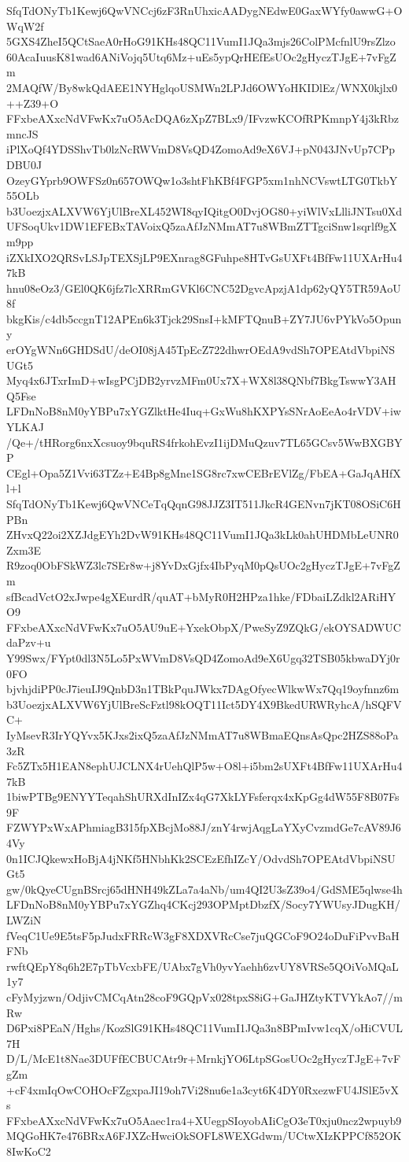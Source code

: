 SfqTdONyTb1Kewj6QwVNCcj6zF3RnUhxicAADygNEdwE0GaxWYfy0awwG+OWqW2f
5GXS4ZheI5QCtSaeA0rHoG91KHs48QC11VumI1JQa3mjs26ColPMcfnlU9rsZlzo
60AcaIuusK81wad6ANiVojq5Utq6Mz+uEs5ypQrHEfEsUOc2gHyczTJgE+7vFgZm
2MAQfW/By8wkQdAEE1NYHglqoUSMWn2LPJd6OWYoHKIDlEz/WNX0kjlx0++Z39+O
FFxbeAXxcNdVFwKx7uO5AcDQA6zXpZ7BLx9/IFvzwKCOfRPKmnpY4j3kRbzmncJS
iPlXoQf4YDSShvTb0lzNcRWVmD8VsQD4ZomoAd9eX6VJ+pN043JNvUp7CPpDBU0J
OzeyGYprb9OWFSz0n657OWQw1o3shtFhKBf4FGP5xm1nhNCVswtLTG0TkbY55OLb
b3UoezjxALXVW6YjUlBreXL452WI8qyIQitgO0DvjOG80+yiWlVxLlliJNTsu0Xd
UFSoqUkv1DW1EFEBxTAVoixQ5zaAfJzNMmAT7u8WBmZTTgciSnw1sqrlf9gXm9pp
iZXkIXO2QRSvLSJpTEXSjLP9EXnrag8GFuhpe8HTvGsUXFt4BfFw11UXArHu47kB
hnu08eOz3/GEl0QK6jfz7lcXRRmGVKl6CNC52DgvcApzjA1dp62yQY5TR59AoU8f
bkgKis/c4db5ccgnT12APEn6k3Tjck29SnsI+kMFTQnuB+ZY7JU6vPYkVo5Opuny
erOYgWNn6GHDSdU/deOI08jA45TpEcZ722dhwrOEdA9vdSh7OPEAtdVbpiNSUGt5
Myq4x6JTxrImD+wIsgPCjDB2yrvzMFm0Ux7X+WX8l38QNbf7BkgTswwY3AHQ5Fse
LFDnNoB8nM0yYBPu7xYGZlktHe4Iuq+GxWu8hKXPYsSNrAoEeAo4rVDV+iwYLKAJ
/Qe+/tHRorg6nxXcsuoy9bquRS4frkohEvzI1ijDMuQzuv7TL65GCsv5WwBXGBYP
CEgl+Opa5Z1Vvi63TZz+E4Bp8gMne1SG8rc7xwCEBrEVlZg/FbEA+GaJqAHfXl+l
SfqTdONyTb1Kewj6QwVNCeTqQqnG98JJZ3IT511JkcR4GENvn7jKT08OSiC6HPBn
ZHvxQ22oi2XZJdgEYh2DvW91KHs48QC11VumI1JQa3kLk0ahUHDMbLeUNR0Zxm3E
R9zoq0ObFSkWZ3lc7SEr8w+j8YvDxGjfx4IbPyqM0pQsUOc2gHyczTJgE+7vFgZm
sfBcadVctO2xJwpe4gXEurdR/quAT+bMyR0H2HPza1hke/FDbaiLZdkl2ARiHYO9
FFxbeAXxcNdVFwKx7uO5AU9uE+YxekObpX/PweSyZ9ZQkG/ekOYSADWUCdaPzv+u
Y99Swx/FYpt0dl3N5Lo5PxWVmD8VsQD4ZomoAd9eX6Ugq32TSB05kbwaDYj0r0FO
bjvhjdiPP0cJ7ieuIJ9QnbD3n1TBkPquJWkx7DAgOfyecWlkwWx7Qq19oyfnnz6m
b3UoezjxALXVW6YjUlBreScFztl98kOQT11Ict5DY4X9BkedURWRyhcA/hSQFVC+
IyMsevR3IrYQYvx5KJxs2ixQ5zaAfJzNMmAT7u8WBmaEQnsAsQpc2HZS88oPa3zR
Fc5ZTx5H1EAN8ephUJCLNX4rUehQlP5w+O8l+i5bm2sUXFt4BfFw11UXArHu47kB
1biwPTBg9ENYYTeqahShURXdInIZx4qG7XkLYFsferqx4xKpGg4dW55F8B07Fs9F
FZWYPxWxAPhmiagB315fpXBcjMo88J/znY4rwjAqgLaYXyCvzmdGe7cAV89J64Vy
0n1ICJQkewxHoBjA4jNKf5HNbhKk2SCEzEfhIZcY/OdvdSh7OPEAtdVbpiNSUGt5
gw/0kQyeCUgnBSrcj65dHNH49kZLa7a4aNb/um4QI2U3sZ39o4/GdSME5qlwse4h
LFDnNoB8nM0yYBPu7xYGZhq4CKcj293OPMptDbzfX/Socy7YWUsyJDugKH/LWZiN
fVeqC1Ue9E5tsF5pJudxFRRcW3gF8XDXVRcCse7juQGCoF9O24oDuFiPvvBaHFNb
rwftQEpY8q6h2E7pTbVcxbFE/UAbx7gVh0yvYaehh6zvUY8VRSe5QOiVoMQaL1y7
cFyMyjzwn/OdjivCMCqAtn28coF9GQpVx028tpxS8iG+GaJHZtyKTVYkAo7//mRw
D6Pxi8PEaN/Hghs/KozSlG91KHs48QC11VumI1JQa3n8BPmIvw1cqX/oHiCVUL7H
D/L/McE1t8Nae3DUFfECBUCAtr9r+MrnkjYO6LtpSGosUOc2gHyczTJgE+7vFgZm
+cF4xmIqOwCOHOcFZgxpaJI19oh7Vi28nu6e1a3cyt6K4DY0RxezwFU4JSlE5vXs
FFxbeAXxcNdVFwKx7uO5Aaec1ra4+XUegpSIoyobAIiCgO3eT0xju0ncz2wpuyb9
MQGoHK7e476BRxA6FJXZcHwciOkSOFL8WEXGdwm/UCtwXIzKPPCf852OK8IwKoC2
